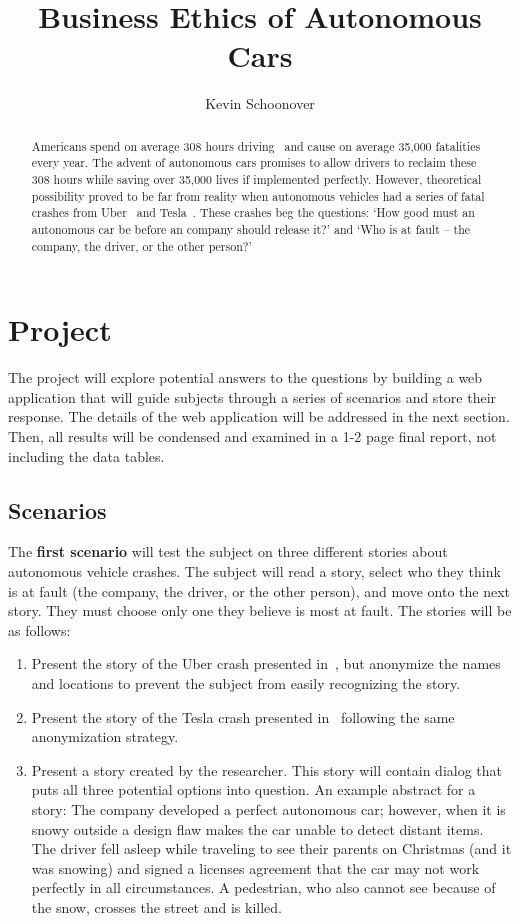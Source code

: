 \documentclass{article}
\begin{document}
\title{Business Ethics of Autonomous Cars}
\author{Kevin Schoonover}

\maketitle

\begin{abstract}
Americans spend on average 308 hours driving~\cite{aaa} and cause on average
35,000 fatalities~\cite{nhtsa_fatalities} every year. The advent of autonomous
cars promises to allow drivers to reclaim these 308 hours while saving over
35,000 lives if implemented perfectly. However, theoretical possibility proved
to be far from reality when autonomous vehicles had a series of fatal crashes
from Uber~\cite{uber} and Tesla~\cite{tesla}. These crashes beg the questions:
`How good must an autonomous car be before an company should release it?' and
`Who is at fault -- the company, the driver, or the other person?'
\end{abstract}

\section{Project}
The project will explore potential answers to the questions by building a web
application that will guide subjects through a series of scenarios and store
their response. The details of the web application will be addressed in the next
section. Then, all results will be condensed and examined in a 1-2 page final
report, not including the data tables.

\subsection{Scenarios}
The \textbf{first scenario} will test the subject on three different stories about
autonomous vehicle crashes. The subject will read a story, select who they think
is at fault (the company, the driver, or the other person), and move onto the
next story. They must choose only one they believe is most at fault.
The stories will be as follows:
\begin{enumerate}
  \item Present the story of the Uber crash presented in~\cite{uber}, but
    anonymize the names and locations to prevent the subject from easily
    recognizing the story.
  \item Present the story of the Tesla crash presented in~\cite{tesla} following
    the same anonymization strategy.
  \item Present a story created by the researcher. This story will contain
    dialog that puts all three potential options into question. An example
    abstract for a story: The company developed a perfect autonomous car;
    however, when it is snowy outside a design flaw makes the car unable to
    detect distant items. The driver fell asleep while traveling to see their
    parents on Christmas (and it was snowing) and signed a licenses agreement
    that the car may not work perfectly in all circumstances. A pedestrian, who
    also cannot see because of the snow, crosses the street and is killed.
\end{enumerate}
\end{document}
